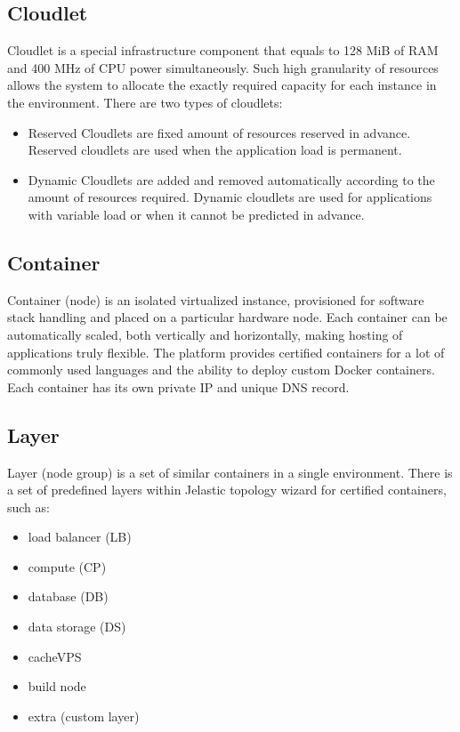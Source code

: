 \documentclass[9pt,twocolumn,twoside]{styles/osajnl}
\begin{document}
\subsection{Cloudlet}
Cloudlet is a special infrastructure component that equals to 128 MiB of RAM and
400 MHz of CPU power simultaneously. Such high granularity of resources allows
the system to allocate the exactly required capacity for each instance in the
environment. There are two types of cloudlets:
\begin{itemize}
\renewcommand{\labelitemi}{\scriptsize$\square$}
\item Reserved Cloudlets are fixed amount of resources reserved in advance.
Reserved cloudlets are used when the application load is permanent.
\item Dynamic Cloudlets are added and removed automatically according to the
amount of resources required. Dynamic cloudlets are used for applications with
variable load or when it cannot be predicted in advance.
\end{itemize}\cite{www-jelastic1}

\subsection{Container}
Container (node) is an isolated virtualized instance, provisioned for software
stack handling and placed on a particular hardware node. Each container can be
automatically scaled, both vertically and horizontally, making hosting of
applications truly flexible. The platform provides certified containers for a
lot of commonly used languages and the ability to deploy custom Docker
containers. Each container has its own private IP and unique DNS record.\cite{www-jelastic4}

\subsection{Layer}
Layer (node group) is a set of similar containers in a single environment. There
is a set of predefined layers within Jelastic topology wizard for certified
containers, such as:\cite{paper-jelastic1}
\begin{itemize}
\renewcommand{\labelitemi}{\scriptsize$\square$}
\item load balancer (LB)
\item compute (CP)
\item database (DB)
\item data storage (DS)
\item cacheVPS
\item build node
\item extra (custom layer)
\end{itemize}\cite{www-jelastic1}
\end{document}
